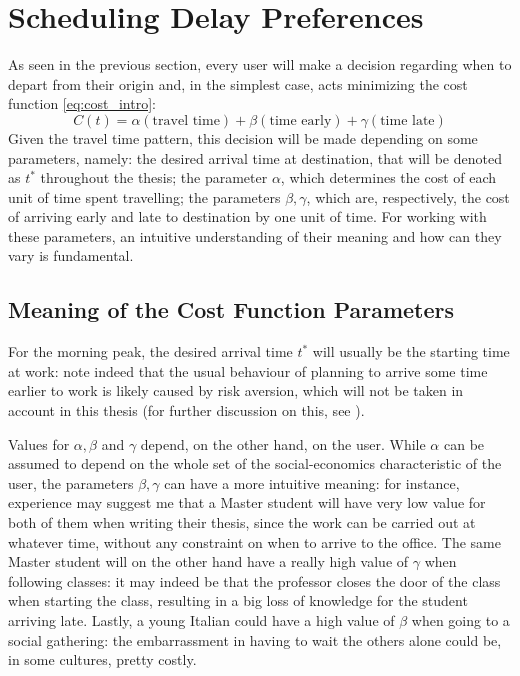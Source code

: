 \section{Scheduling Delay Preferences}

As seen in the previous section, every user will make a decision regarding when to depart from their origin and,
in the simplest case, acts minimizing the cost function \eqref{eq:cost_intro}:
\begin{equation*}
  C(t) = \alpha(\text{travel time}) + \beta (\text{time early}) + \gamma (\text{time late})
\end{equation*}
Given the travel time pattern, this decision will be made depending on some parameters, namely:
the desired arrival time at destination, that will be denoted as \(t^*\) throughout the thesis;
the parameter \(\alpha\), which determines the cost of each unit of time spent travelling;
the parameters \(\beta, \gamma\), which are, respectively,
the cost of arriving early and late to destination by one unit of time.
For working with these parameters, an intuitive understanding of their meaning and how can they vary is fundamental.

\subsection{Meaning of the Cost Function Parameters}

For the morning peak, the desired arrival time \(t^*\) will usually be the starting time at work:
note indeed that the usual behaviour of planning to arrive some time earlier to work is likely caused by risk aversion, which will not be taken in account in this thesis (for further discussion on this, see \cite{doi:10.1177/0361198118792336}).

Values for \(\alpha, \beta\) and \(\gamma\) depend, on the other hand, on the user.
While \(\alpha\) can be assumed to depend on the whole set of the social-economics characteristic of the user,
the parameters \(\beta, \gamma\) can have a more intuitive meaning:
for instance, experience may suggest me that a Master student will have very low value for both of them when writing their thesis, since the work can be carried out at whatever time, without any constraint on when to arrive to the office.
The same Master student will on the other hand have a really high value of \(\gamma\) when following classes:
it may indeed be that the professor closes the door of the class when starting the class, resulting in a big loss of knowledge for the student arriving late.
Lastly, a young Italian could have a high value of \(\beta\) when going to a social gathering:
the embarrassment in having to wait the others alone could be, in some cultures, pretty costly.

